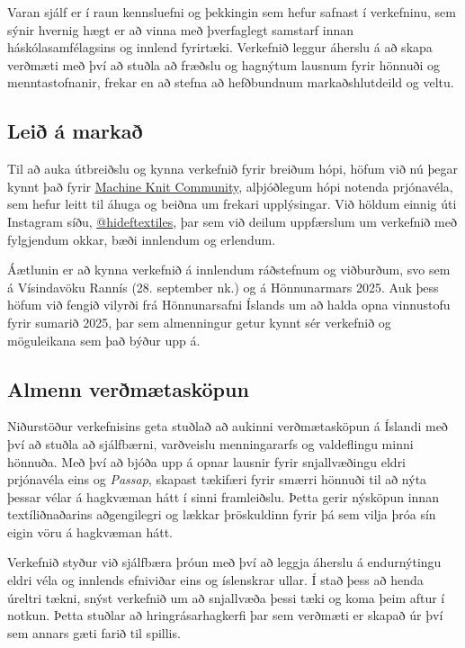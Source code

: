 \documentclass[a4paper,12pt,twoside]{article}
\begin{document}
Varan sjálf er í raun kennsluefni og þekkingin sem hefur safnast í verkefninu, sem sýnir hvernig hægt er að vinna með þverfaglegt samstarf innan háskólasamfélagsins og innlend fyrirtæki. Verkefnið leggur áherslu á að skapa verðmæti með því að stuðla að fræðslu og hagnýtum lausnum fyrir hönnuði og menntastofnanir, frekar en að stefna að hefðbundnum markaðshlutdeild og veltu.

\subsection{Leið á markað}
Til að auka útbreiðslu og kynna verkefnið fyrir breiðum hópi, höfum við nú þegar kynnt það fyrir \href{https://www.mkc.community/about-us}{Machine Knit Community}, alþjóðlegum hópi notenda prjónavéla, sem hefur leitt til áhuga og beiðna um frekari upplýsingar. Við höldum einnig úti Instagram síðu, \href{https://www.instagram.com/hideftextiles/}{@hideftextiles}, þar sem við deilum uppfærslum um verkefnið með fylgjendum okkar, bæði innlendum og erlendum.

Áætlunin er að kynna verkefnið á innlendum ráðstefnum og viðburðum, svo sem á Vísindavöku Rannís (28. september nk.) og á Hönnunarmars 2025. Auk þess höfum við fengið vilyrði frá Hönnunarsafni Íslands um að halda opna vinnustofu fyrir sumarið 2025, þar sem almenningur getur kynnt sér verkefnið og möguleikana sem það býður upp á.

\subsection{Almenn verðmætasköpun}
Niðurstöður verkefnisins geta stuðlað að aukinni verðmætasköpun á Íslandi með því að stuðla að sjálfbærni, varðveislu menningararfs og valdeflingu minni hönnuða. Með því að bjóða upp á opnar lausnir fyrir snjallvæðingu eldri prjónavéla eins og \textit{Passap}, skapast tækifæri fyrir smærri hönnuði til að nýta þessar vélar á hagkvæman hátt í sinni framleiðslu. Þetta gerir nýsköpun innan textíliðnaðarins aðgengilegri og lækkar þröskuldinn fyrir þá sem vilja þróa sín eigin vöru á hagkvæman hátt.

Verkefnið styður við sjálfbæra þróun með því að leggja áherslu á endurnýtingu eldri véla og innlends efniviðar eins og íslenskrar ullar. Í stað þess að henda úreltri tækni, snýst verkefnið um að snjallvæða þessi tæki og koma þeim aftur í notkun. Þetta stuðlar að hringrásarhagkerfi þar sem verðmæti er skapað úr því sem annars gæti farið til spillis.
\end{document}
